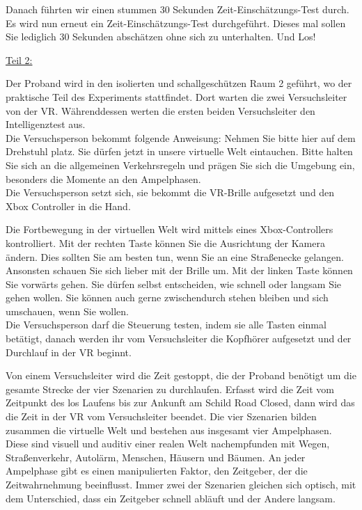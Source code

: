 \documentclass{Bericht}
\begin{document}
Danach führten wir einen stummen 30 Sekunden Zeit-Einschätzungs-Test durch.  \glqq Es wird nun erneut ein Zeit-Einschätzungs-Test durchgeführt. Dieses mal sollen Sie lediglich 30 Sekunden abschätzen ohne sich zu unterhalten. Und Los!\grqq{}

\underline{Teil 2:} 

Der Proband wird in den isolierten und schallgeschützen \glqq Raum 2\grqq{} geführt, wo der praktische Teil des Experiments stattfindet. Dort warten die zwei Versuchsleiter von der VR. Währenddessen werten die ersten beiden Versuchsleiter den Intelligenztest aus.  \\

Die Versuchsperson bekommt folgende Anweisung: \glqq Nehmen Sie bitte hier auf dem Drehstuhl platz. Sie dürfen jetzt in unsere virtuelle Welt eintauchen. Bitte halten Sie sich an die allgemeinen Verkehrsregeln und prägen Sie sich die Umgebung ein, besonders die Momente an den Ampelphasen.\grqq{} \\

Die Versuchsperson setzt sich, sie bekommt die VR-Brille aufgesetzt und den Xbox Controller in die Hand.

\glqq Die Fortbewegung in der virtuellen Welt wird mittels eines Xbox-Controllers kontrolliert. Mit der rechten Taste können Sie die Ausrichtung der Kamera ändern. Dies sollten Sie am besten tun, wenn Sie an eine Straßenecke gelangen. Ansonsten schauen Sie sich lieber mit der Brille um. Mit der linken Taste können Sie vorwärts gehen. Sie dürfen selbst entscheiden, wie schnell oder langsam Sie gehen wollen. Sie können auch gerne zwischendurch stehen bleiben und sich umschauen, wenn Sie wollen.\grqq{} \\ Die Versuchsperson darf die Steuerung testen, indem sie alle Tasten einmal betätigt, danach werden ihr vom Versuchsleiter die Kopfhörer aufgesetzt und der Durchlauf in der VR beginnt. 

Von einem Versuchsleiter wird die Zeit gestoppt, die der Proband benötigt um die gesamte Strecke der vier Szenarien zu durchlaufen. Erfasst wird die Zeit vom Zeitpunkt des los Laufens bis zur Ankunft am Schild \glqq Road Closed\grqq{}, dann wird das die Zeit in der VR vom Versuchsleiter beendet. Die vier Szenarien bilden zusammen die virtuelle Welt und bestehen aus insgesamt vier Ampelphasen. Diese sind visuell und auditiv einer realen Welt nachempfunden mit Wegen, Straßenverkehr, Autolärm, Menschen, Häusern und Bäumen. An jeder Ampelphase gibt es einen manipulierten Faktor, den Zeitgeber, der die Zeitwahrnehmung beeinflusst. Immer zwei der Szenarien gleichen sich optisch, mit dem Unterschied, dass ein Zeitgeber schnell abläuft und der Andere langsam. \\
\end{document}
